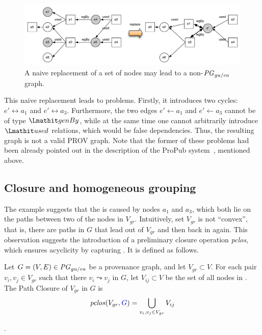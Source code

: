 \begin{figure}
\centering
\includegraphics[scale=.5]{figures/non-convex-ex-1.pdf} 
\caption{A naive replacement of a set of nodes may lead to a non-$\mathit{PG}_{gu/ea}$ graph.} \label{fig:non-convex-ex-1}
\end{figure}

This naive replacement leads to problems. Firstly, it introduces two cycles: $e'  \leftrightarrow a_1$ and $e'  \leftrightarrow a_3$. Furthermore, the two edges 
$e'  \leftarrow a_1$ and $e'  \leftarrow a_3$ cannot be of type $\wgby$, while at the same time one cannot arbitrarily introduce $\used$ relations, which would be false dependencies.
Thus, the resulting graph is not a valid PROV graph. Note that the former of these problems had been already pointed out in the description of the ProPub system~\citep{springerlink:10.1007/978-3-642-22351-8_13}, mentioned above.

\subsection{Closure and homogeneous grouping}
\label{sec:closure}

The example suggests that the  is caused by nodes $a_1$ and $a_3$, which both lie on the paths between two of the nodes in $V_{gr}$. Intuitively, set $V_{gr}$ is not ``convex'', that is, there are paths in $G$ that lead out of $V_{gr}$ and then back in again. This observation suggests the introduction of a preliminary closure operation \textit{pclos}, which ensures acyclicity by capturing . It is defined as follows.

\vspace*{10pt}
\begin{definition}
\label{def:clos}
Let $G = (V,E) \in \mathit{PG}_{gu/ea}$ be a provenance graph, and let $V_{gr} \subset V$.  
For each pair  $v_i, v_j \in V_{gr}$ such that there  $v_i \leadsto v_j$ in $G$, let $V_{ij} \subset V$ be the set of all nodes in .
The Path Closure of $V_{gr}$ in $G$ is
\[\clos(V_{gr}, \jwb{G})  =  \bigcup_{v_i, v_j \in V_{gr}} V_{ij} \]
\end{definition}
  . 


